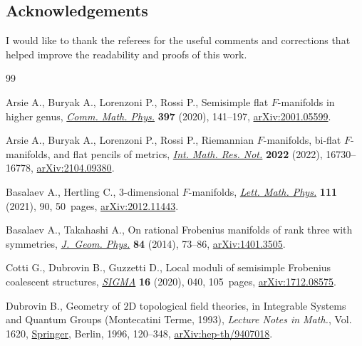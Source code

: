 \documentclass[pdftex]{sigma}
\numberwithin{equation}{section}
\begin{document}
\subsection*{Acknowledgements}
I would like to thank the referees for the useful comments and corrections that helped improve the readability and proofs of this work.

\begin{thebibliography}{99}
\footnotesize\itemsep=0pt

Arsie A., Buryak A., Lorenzoni P., Rossi P., Semisimple flat {$F$}-manifolds in
 higher genus, \href{https://doi.org/10.1007/s00220-022-04450-6}{\textit{Comm. Math. Phys.}} \textbf{397} (2020), 141--197,
 \href{https://arxiv.org/abs/2001.05599}{arXiv:2001.05599}.

Arsie A., Buryak A., Lorenzoni P., Rossi P., Riemannian {$F$}-manifolds, bi-flat
 {$F$}-manifolds, and flat pencils of metrics, \href{https://doi.org/10.1093/imrn/rnab203}{\textit{Int. Math. Res. Not.}}
 \textbf{2022} (2022), 16730--16778, \href{https://arxiv.org/abs/2104.09380}{arXiv:2104.09380}.

Basalaev A., Hertling C., 3-dimensional {$F$}-manifolds, \href{https://doi.org/10.1007/s11005-021-01432-y}{\textit{Lett. Math.
 Phys.}} \textbf{111} (2021), 90, 50~pages, \href{https://arxiv.org/abs/2012.11443}{arXiv:2012.11443}.

Basalaev A., Takahashi A., On rational {F}robenius manifolds of rank three with
 symmetries, \href{https://doi.org/10.1016/j.geomphys.2014.05.030}{\textit{J.~Geom. Phys.}} \textbf{84} (2014), 73--86,
 \href{https://arxiv.org/abs/1401.3505}{arXiv:1401.3505}.

Cotti G., Dubrovin B., Guzzetti D., Local moduli of semisimple {F}robenius
 coalescent structures, \href{https://doi.org/10.3842/SIGMA.2020.040}{\textit{SIGMA}} \textbf{16} (2020), 040, 105~pages,
 \href{https://arxiv.org/abs/1712.08575}{arXiv:1712.08575}.

Dubrovin B., Geometry of {$2$}{D} topological field theories, in Integrable
 {S}ystems and {Q}uantum {G}roups ({M}ontecatini {T}erme, 1993),
 \textit{Lecture Notes in Math.}, Vol. 1620, \href{https://doi.org/10.1007/BFb0094793}{Springer}, Berlin, 1996, 120--348,
 \href{https://arxiv.org/abs/hep-th/9407018}{arXiv:hep-th/9407018}.


\end{thebibliography}
\end{document}
